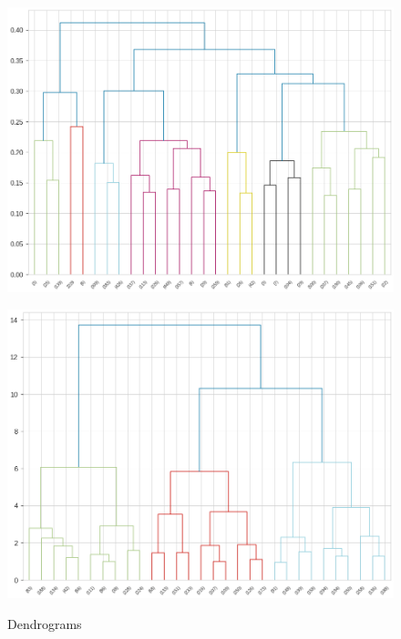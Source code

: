 \documentclass[a4paper,11pt,dvipsnames]{article}
\begin{document}
\begin{figure}[h!]
\begin{minipage}[b]{.25\linewidth}
    \end{minipage}\hfill
    \begin{minipage}[b]{.25\linewidth}
    \centering
    \includegraphics[width=\textwidth]{Graphs/h_average.png}\label{fig:avg_dend}
    \end{minipage}\hfill
    \begin{minipage}[b]{.25\linewidth}
    \centering
    \includegraphics[width=\textwidth]{Graphs/h_ward.png}\label{fig:Ward_dend}
    \end{minipage}\hfill
    \caption{Dendrograms} \label{fig:dends}
\end{figure}
\end{document}
